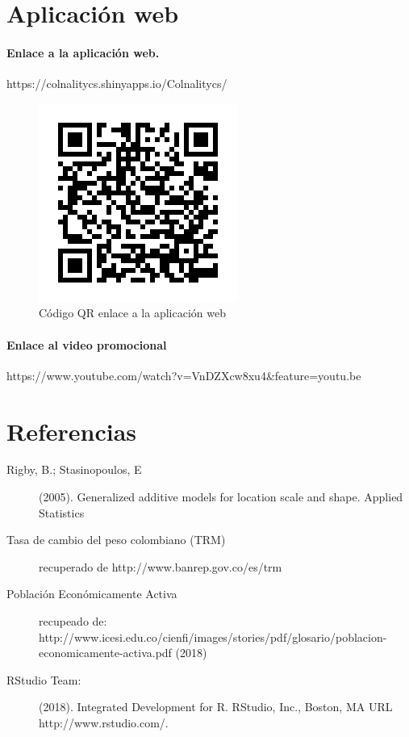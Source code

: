 \documentclass[11pt,twoside]{article}
\begin{document}
\section{Aplicación web}
\noindent
\paragraph{Enlace a la aplicación web.}
https://colnalitycs.shinyapps.io/Colnalitycs/
\begin{figure}[H]
	\centering
	\includegraphics{qr_img.png}
	\caption{Código QR enlace a la aplicación web}
\end{figure}

\noindent
\paragraph{Enlace al video promocional} https://www.youtube.com/watch?v=VnDZXcw8xu4&feature=youtu.be



\section{Referencias}
\noindent

\begin{description}


\item[Rigby, B.; Stasinopoulos, E] (2005).
Generalized additive
models for location scale and shape. Applied Statistics

\item[Tasa de cambio del peso colombiano (TRM)]  recuperado de http://www.banrep.gov.co/es/trm


\item[Población Económicamente Activa]
recupeado de:\\
http://www.icesi.edu.co/cienfi/images/stories/pdf/glosario/poblacion-economicamente-activa.pdf (2018)


\item[RStudio Team:] (2018).
Integrated Development for R. RStudio, Inc., Boston, MA URL http://www.rstudio.com/.  


\end{description}
\end{document}
